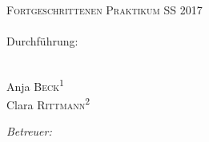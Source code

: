 \begin{titlepage}
	\par
	\hfill
	\par
\begin{center}
\ \\
[5.5cm]	
	\textsc{\Huge Fortgeschrittenen Praktikum SS 2017} \\
[1.5cm]
	\Huge\textbf{\Versuch} \\
[1cm]
	{\large Durchführung: \Tag} \\
	{\large \Korrektur} \\
[4.5cm]
\begin{minipage}{0.4\textwidth}
	\begin{flushleft} \large
		Anja \textsc{Beck}\textsuperscript{1} \\
		Clara \textsc{Rittmann}\textsuperscript{2}
	\end{flushleft}
\end{minipage}
\hfill
\begin{minipage}{0.4\textwidth}
	\begin{flushright} \large
		\emph{Betreuer:} \\
		\Betreuer
	\end{flushright}
\end{minipage}
\end{center}
\end{titlepage}